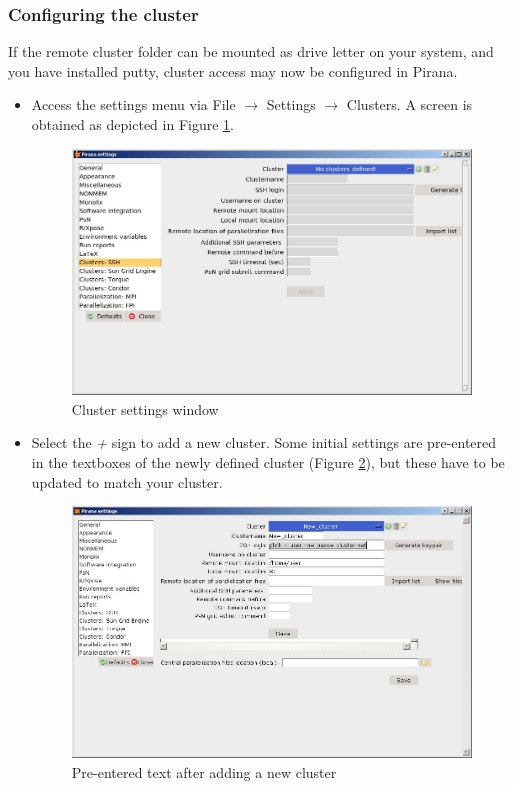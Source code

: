 \subsubsection*{Configuring the cluster}
If the remote cluster folder can be mounted as drive letter on your
system, and you have installed putty, cluster access may now be
configured in Pirana.
\begin{itemize}
\item Access the settings menu via File $\rightarrow$ Settings
  $\rightarrow$ Clusters. A screen is obtained as depicted in Figure  \ref{fig:Fig1}.

\begin{figure}[h] \centering
    \includegraphics[scale=.4]{images/cluster_1.JPG}
    \caption{Cluster settings window\label{fig:Fig1}
}
\end{figure}

\item Select the \emph{\Large{+}} sign to add a new cluster. Some
  initial settings are pre-entered in the textboxes of the newly
  defined cluster (Figure  \ref{fig:Fig2}), but these have to be updated to match
  your cluster.

\begin{figure}[h] \centering
    \includegraphics[scale=.4]{images/cluster_2.JPG}
    \caption{Pre-entered text after adding a new cluster\label{fig:Fig2}
}
\end{figure}


\end{itemize}

